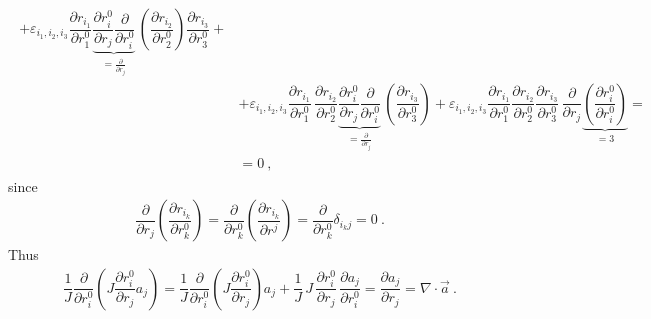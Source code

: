 \documentclass[letterpaper,10pt,english]{jupyterBook}
\begin{document}
\begin{equation*}
\begin{split}
\begin{aligned}
   + \varepsilon_{i_1, i_2, i_3}  \dfrac{\partial r_{i_1}}{\partial r^0_1} \underbrace{ \dfrac{\partial r^0_i}{\partial r_j} \dfrac{\partial }{\partial r_i^0}}_{= \frac{\partial }{\partial r_j}} \, \left(\dfrac{\partial r_{i_2}}{\partial r^0_2} \right) \dfrac{\partial r_{i_3}}{\partial r^0_3} + \\
 & + \varepsilon_{i_1, i_2, i_3} \dfrac{\partial r_{i_1}}{\partial r^0_1} \, \dfrac{\partial r_{i_2}}{\partial r^0_2} \underbrace{\dfrac{\partial r^0_i}{\partial r_j}\dfrac{\partial }{\partial r_i^0}}_{=\frac{\partial}{\partial r_j}} \, \left(\dfrac{\partial r_{i_3}}{\partial r^0_3}\right)  
   + \varepsilon_{i_1, i_2, i_3}\dfrac{\partial r_{i_1}}{\partial r^0_1} \dfrac{\partial r_{i_2}}{\partial r^0_2} \dfrac{\partial r_{i_3}}{\partial r^0_3} \, \dfrac{\partial }{\partial r_j} \underbrace{\left(  \dfrac{\partial r^0_i}{\partial r^0_i} \right)}_{=3} = \\
   & = 0 \ ,
\end{aligned}\end{split}
\end{equation*}
\sphinxAtStartPar
since
\begin{equation*}
\begin{split}\dfrac{\partial }{\partial r_j} \left( \dfrac{\partial r_{i_k}}{\partial r^0_k} \right) = \dfrac{\partial }{\partial r^0_k} \left( \dfrac{\partial r_{i_k}}{\partial r^j} \right) = \dfrac{\partial}{\partial r^0_k} \delta_{i_k j} = 0 \ .\end{split}
\end{equation*}
\sphinxAtStartPar
Thus
\begin{equation*}
\begin{split}\dfrac{1}{J}\dfrac{\partial}{\partial r^0_i} \left( J \dfrac{\partial r^0_i}{\partial r_j} a_j \right) = 
\dfrac{1}{J}\dfrac{\partial}{\partial r^0_i} \left( J \dfrac{\partial r^0_i}{\partial r_j} \right) a_j + \dfrac{1}{J} \, J \, \dfrac{\partial r^0_i}{\partial r_j} \, \dfrac{\partial a_j}{\partial r^0_i} = \dfrac{\partial a_j}{\partial r_j} = \nabla \cdot \vec{a} \ . \end{split}
\end{equation*}
\end{document}
